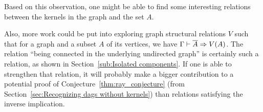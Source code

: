 Based on this observation, one might be able to find some interesting relations between the kernels in the graph and the set $A$.

Also, more work could be put into exploring graph structural relations $V$ such that for a graph and a subset $A$ of its vertices, we have $\Gamma \vdash \ol{A} \Rightarrow V(A)$.
The relation ``being connected in the underlying undirected graph'' is certainly such a relation, as shown in Section~\ref{sub:Isolated components}.
If one is able to strengthen that relation, it will probably make a bigger contribution to a potential proof of Conjecture~\ref{thm:ray_conjecture} (from Section~\ref{sec:Recognizing dags without kernels}) than relations satisfying the inverse implication.

